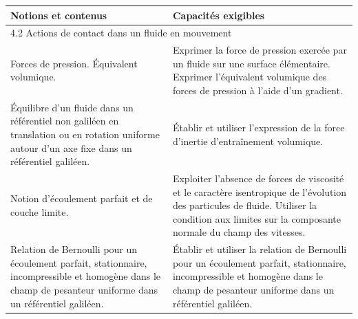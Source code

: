 
\vspace{0.25cm}

\begin{tabularx}{\textwidth}[t]{|X|X|}
  \hline 
  \textbf{Notions et contenus} & \textbf{Capacités exigibles} \\
  \hline
  \multicolumn{2}{|l|}{4.2 Actions de contact dans un fluide en mouvement } \\
  \hline 
  Forces de pression. Équivalent volumique. & Exprimer la force de pression exercée par un fluide sur une surface élémentaire. Exprimer l'équivalent volumique des forces de pression à l'aide d'un gradient. \\
  \hline
    Équilibre d'un fluide dans un référentiel non galiléen en translation ou en rotation uniforme autour d'un axe fixe dans un référentiel galiléen. & Établir et utiliser l'expression de la force d'inertie d'entraînement volumique. \\
  \hline 
  Notion d'écoulement parfait et de couche limite. & Exploiter l'absence de forces de viscosité et le caractère isentropique de l'évolution des particules de fluide. Utiliser la condition aux limites sur la composante normale du champ des vitesses. \\
  \hline 
  Relation de Bernoulli pour un écoulement parfait, stationnaire, incompressible et homogène dans le champ de pesanteur uniforme dans un référentiel galiléen. & Établir et utiliser la relation de Bernoulli pour un écoulement parfait, stationnaire, incompressible et homogène dans le champ de pesanteur uniforme dans un référentiel galiléen. \\
  \hline
\end{tabularx}
